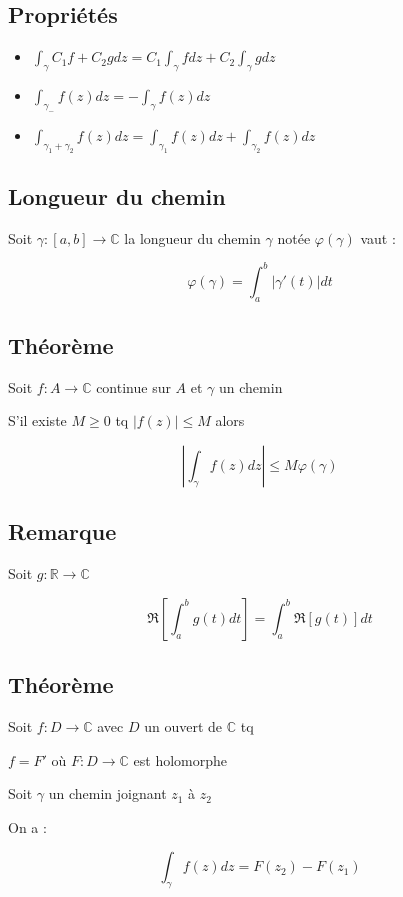 \documentclass[a4paper,10pt]{report}
\newcommand{\ap}{\rightarrow}
\newcommand{\R}{\mathbb{R}}
\newcommand{\C}{\mathbb{C}}
\newcommand{\abs}[1]{\left\vert #1 \right\vert}
\begin{document}
\subsection{Propriétés}

\begin{itemize}
\item{$\int_\gamma C_1f + C_2 g dz = C_1 \int_\gamma f dz + C_2 \int_\gamma g dz$}
\item{$\int_{\gamma_-} f(z) dz = - \int_\gamma f(z) dz$}
\item{$\int_{\gamma_1 + \gamma_2} f(z) dz = \int_{\gamma_1} f(z) dz + \int_{\gamma_2} f(z)dz$}
\end{itemize}

\subsection{Longueur du chemin}

Soit $\gamma : [a,b] \ap \C$ la longueur du chemin $\gamma$ notée $\varphi(\gamma)$ vaut :

\[\varphi(\gamma) = \int_a^b \abs{\gamma'(t)} dt \]

\subsection{Théorème}

Soit $f : A \ap \C$ continue sur $A$ et $\gamma$ un chemin

S'il existe $M \geq 0$ tq $\abs{f(z)} \leq M$ alors

\[ \abs{\int_\gamma f(z) dz} \leq M \varphi(\gamma) \]

\subsection{Remarque}

Soit $g : \R \ap \C$

\[ \Re \left[\int_a^b g(t) dt \right] = \int_a^b \Re \left[ g(t) \right] dt \]

\subsection{Théorème}
Soit $f : D \ap \C$ avec $D$ un ouvert de $\C$ tq

$f = F'$ où $F : D \ap \C$ est holomorphe

Soit $\gamma$ un chemin joignant $z_1$ à $z_2$

On a :

\[ \int_\gamma f(z) dz = F(z_2) - F(z_1) \]
\end{document}

